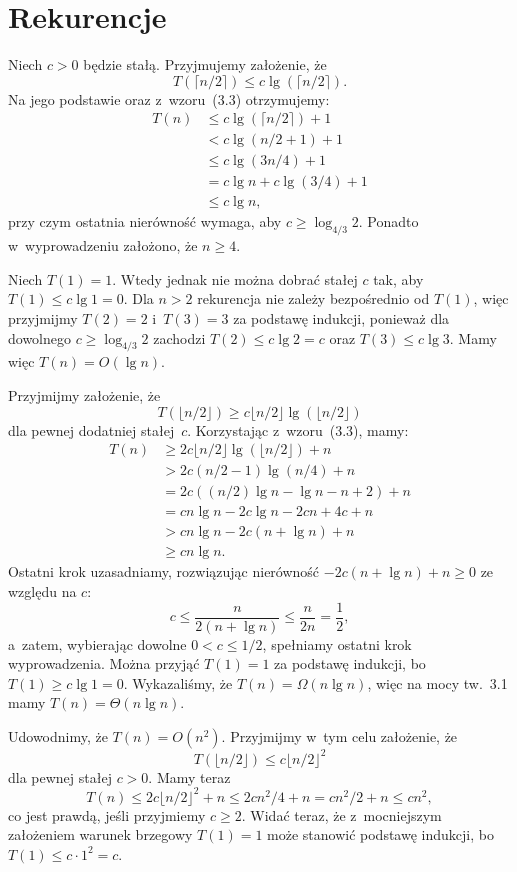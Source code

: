 \chapter{Rekurencje}


\exercise %
Niech $c>0$ będzie stałą. Przyjmujemy założenie, że
\[
    T(\lceil n/2\rceil)\le c\lg(\lceil n/2\rceil).
\]
Na jego podstawie oraz z~wzoru~(3.3) otrzymujemy:
\begin{align*}
	T(n) &\le c\lg(\lceil n/2\rceil)+1 \\
	&< c\lg(n/2+1)+1 \\
	&\le c\lg(3n/4)+1 \\
	&= c\lg n+c\lg(3/4)+1 \\
	&\le c\lg n,
\end{align*}
przy czym ostatnia nierówność wymaga, aby $c\ge\log_{4/3}2$. Ponadto w~wyprowadzeniu założono, że $n\ge4$.

Niech $T(1)=1$. Wtedy jednak nie można dobrać stałej $c$ tak, aby $T(1)\le c\lg1=0$. Dla $n>2$ rekurencja nie zależy bezpośrednio od $T(1)$, więc przyjmijmy $T(2)=2$ i~$T(3)=3$ za podstawę indukcji, ponieważ dla dowolnego $c\ge\log_{4/3}2$ zachodzi $T(2)\le c\lg2=c$ oraz $T(3)\le c\lg3$. Mamy więc $T(n)=O(\lg n)$.

\exercise %
Przyjmijmy założenie, że
\[
	T(\lfloor n/2\rfloor) \ge c\lfloor n/2\rfloor\lg(\lfloor n/2\rfloor)
\]
dla pewnej dodatniej stałej~$c$. Korzystając z~wzoru~(3.3), mamy:
\begin{align*}
	T(n) &\ge 2c\lfloor n/2\rfloor\lg(\lfloor n/2\rfloor)+n \\
	&> 2c(n/2-1)\lg(n/4)+n \\
	&= 2c((n/2)\lg n-\lg n-n+2)+n \\
	&= cn\lg n-2c\lg n-2cn+4c+n \\
	&> cn\lg n-2c(n+\lg n)+n \\
	&\ge cn\lg n.
\end{align*}
Ostatni krok uzasadniamy, rozwiązując nierówność $-2c(n+\lg n)+n\ge0$ ze względu na $c$:
\[
	c \le \frac{n}{2(n+\lg n)} \le \frac{n}{2n} = \frac{1}{2},
\]
a~zatem, wybierając dowolne $0<c\le1/2$, spełniamy ostatni krok wyprowadzenia. Można przyjąć $T(1)=1$ za podstawę indukcji, bo $T(1)\ge c\lg1=0$. Wykazaliśmy, że $T(n)=\Omega(n\lg n)$, więc na mocy tw.~3.1 mamy $T(n)=\Theta(n\lg n)$.

\exercise %
Udowodnimy, że $T(n)=O(n^2)$. Przyjmijmy w~tym celu założenie, że
\[
    T(\lfloor n/2\rfloor) \le c\lfloor n/2\rfloor^2
\]
dla pewnej stałej $c>0$. Mamy teraz
\[
	T(n) \le 2c\lfloor n/2\rfloor^2+n \le 2cn^2\!/4 + n = cn^2\!/2+n \le cn^2,
\]
co jest prawdą, jeśli przyjmiemy $c\ge2$. Widać teraz, że z~mocniejszym założeniem warunek brzegowy $T(1)=1$ może stanowić podstawę indukcji, bo $T(1)\le c\cdot1^2=c$.

